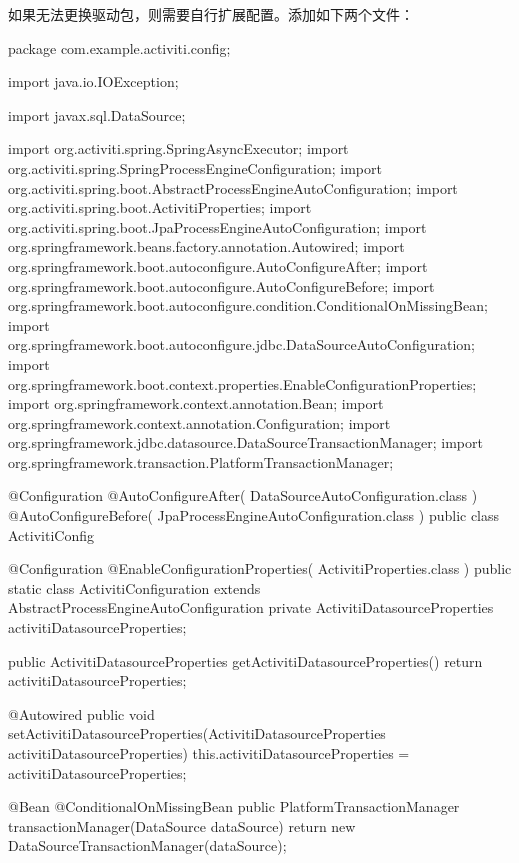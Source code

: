 \documentclass[letterpaper,10pt,english]{sphinxmanual}
\begin{document}
如果无法更换驱动包，则需要自行扩展配置。添加如下两个文件：


\begin{sphinxVerbatim}[commandchars=\\\{\}]
package com.example.activiti.config;

import java.io.IOException;

import javax.sql.DataSource;

import org.activiti.spring.SpringAsyncExecutor;
import org.activiti.spring.SpringProcessEngineConfiguration;
import org.activiti.spring.boot.AbstractProcessEngineAutoConfiguration;
import org.activiti.spring.boot.ActivitiProperties;
import org.activiti.spring.boot.JpaProcessEngineAutoConfiguration;
import org.springframework.beans.factory.annotation.Autowired;
import org.springframework.boot.autoconfigure.AutoConfigureAfter;
import org.springframework.boot.autoconfigure.AutoConfigureBefore;
import org.springframework.boot.autoconfigure.condition.ConditionalOnMissingBean;
import org.springframework.boot.autoconfigure.jdbc.DataSourceAutoConfiguration;
import org.springframework.boot.context.properties.EnableConfigurationProperties;
import org.springframework.context.annotation.Bean;
import org.springframework.context.annotation.Configuration;
import org.springframework.jdbc.datasource.DataSourceTransactionManager;
import org.springframework.transaction.PlatformTransactionManager;

@Configuration
@AutoConfigureAfter(\PYGZob{} DataSourceAutoConfiguration.class \PYGZcb{})
@AutoConfigureBefore(\PYGZob{} JpaProcessEngineAutoConfiguration.class \PYGZcb{})
public class ActivitiConfig \PYGZob{}

   @Configuration
   @EnableConfigurationProperties(\PYGZob{} ActivitiProperties.class \PYGZcb{})
   public static class ActivitiConfiguration extends AbstractProcessEngineAutoConfiguration \PYGZob{}
      private ActivitiDatasourceProperties activitiDatasourceProperties;

      public ActivitiDatasourceProperties getActivitiDatasourceProperties() \PYGZob{}
         return activitiDatasourceProperties;
      \PYGZcb{}

      @Autowired
      public void setActivitiDatasourceProperties(ActivitiDatasourceProperties activitiDatasourceProperties) \PYGZob{}
         this.activitiDatasourceProperties = activitiDatasourceProperties;
      \PYGZcb{}

      @Bean
      @ConditionalOnMissingBean
      public PlatformTransactionManager transactionManager(DataSource dataSource) \PYGZob{}
         return new DataSourceTransactionManager(dataSou\PYGZhy{}rce);
      \PYGZcb{}


\end{sphinxVerbatim}
\end{document}
